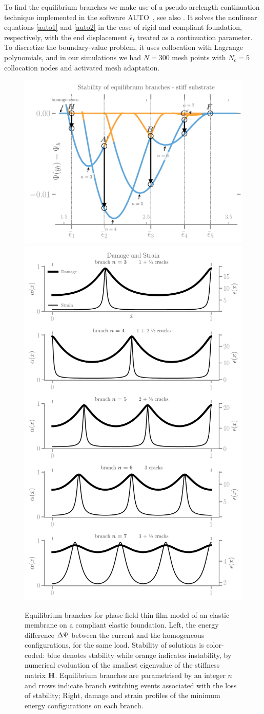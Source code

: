 To find the equilibrium branches we make use of a pseudo-arclength continuation technique implemented in the software AUTO~\cite{Doedel1981-sa}, see also \cite{Pattamatta2014-pn}. It solves the nonlinear equations \ref{auto1} and \ref{auto2} in the case of rigid and compliant foundation, respectively, with the end displacement $\bar\epsilon_t$ treated as a continuation parameter. To discretize the boundary-value problem, it uses collocation with Lagrange polynomials, and in our simulations we had $N=300$ mesh points with $N_c = 5$ collocation nodes and activated mesh adaptation. 
\begin{figure}
\centering
    \hspace*{-.3cm}
\includegraphics[align=c, width=.6\textwidth]{../images/model_stiff_energy.pdf}
\includegraphics[align=c, width=.4\textwidth]{../images/model_stiff_fields.pdf}
    \caption{
Equilibrium branches for phase-field thin film model of an elastic membrane on a compliant elastic foundation. Left, the energy difference $\Delta \Psi$ between the current and the homogeneous configurations, for the same load. Stability of solutions is color-coded: blue denotes stability while orange indicates instability, by numerical evaluation of the smallest eigenvalue of the stiffness matrix $\mathbf{H}$. Equilibrium branches are parametrised by an integer $n$ and rrows indicate branch switching events associated with the loss of stability; Right, damage and strain profiles of the minimum energy configurations on each branch.}
    \label{fig:branches-stiff}
\end{figure}
